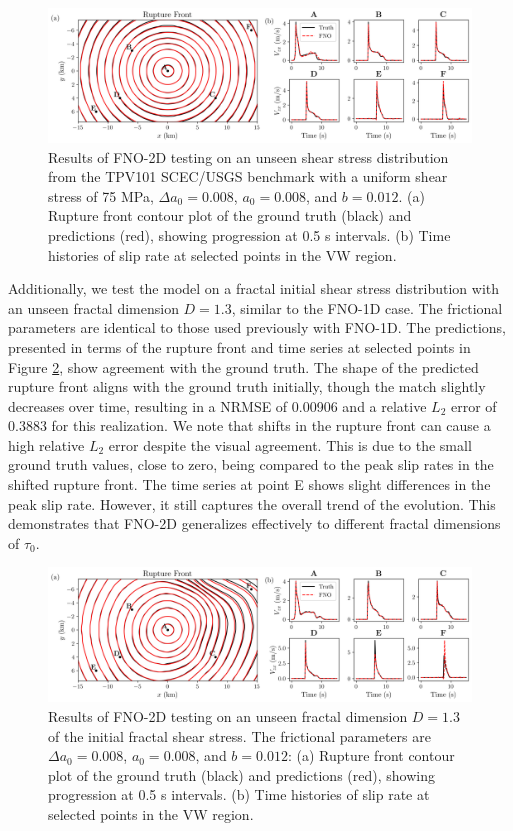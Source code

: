 \documentclass[draft]{agujournal2019}
\begin{document}
\begin{figure}
\centering
\includegraphics[width=1.0\linewidth]{3D_rupture_front_SCEC2.png}
\caption{\label{fig:3D_SCEC}Results of FNO-2D testing on an unseen shear stress distribution from the TPV101 SCEC/USGS benchmark with a uniform shear stress of 75 MPa, \(\Delta a_{0} = 0.008\), \(a_{0} = 0.008\), and \(b = 0.012\). (a) Rupture front contour plot of the ground truth (black) and predictions (red), showing progression at 0.5 s intervals. (b) Time histories of slip rate at selected points in the VW region.
}
\end{figure}

Additionally, we test the model on a fractal initial shear stress distribution with an unseen fractal dimension \(D = 1.3\), similar to the FNO-1D case. The frictional parameters are identical to those used previously with FNO-1D. The predictions, presented in terms of the rupture front and time series at selected points in Figure \ref{fig:3D_fractal_dim13}, show agreement with the ground truth. The shape of the predicted rupture front aligns with the ground truth initially, though the match slightly decreases over time, resulting in a NRMSE of 0.00906 and a relative \(L_2\) error of 0.3883 for this realization. We note that shifts in the rupture front can cause a high relative \(L_2\) error despite the visual agreement. This is due to the small ground truth values, close to zero, being compared to the peak slip rates in the shifted rupture front. The time series at point E shows slight differences in the peak slip rate. However, it still captures the overall trend of the evolution. This demonstrates that FNO-2D generalizes effectively to different fractal dimensions of \(\tau_{0}\).


\begin{figure}
\centering
\includegraphics[width=1.0\linewidth]{3D_rupture_front_fractal_dim13_2.png}
\caption{\label{fig:3D_fractal_dim13}Results of FNO-2D testing on an unseen fractal dimension \(D = 1.3\) of the initial fractal shear stress. The frictional parameters are \(\Delta a_{0} = 0.008\), \(a_{0} = 0.008\), and \(b = 0.012\): (a) Rupture front contour plot of the ground truth (black) and predictions (red), showing progression at 0.5 s intervals. (b) Time histories of slip rate at selected points in the VW region.
}
\end{figure}
\end{document}
